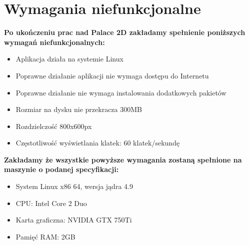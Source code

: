 \documentclass{article}
\begin{document}
\section{Wymagania niefunkcjonalne}

\textbf{Po ukończeniu prac nad Palace 2D zakładamy spełnienie poniższych
wymagań niefunkcjonalnych:}
  \begin{itemize}
  \item Aplikacja działa na systemie Linux
  \item Poprawne działanie aplikacji nie wymaga dostępu do Internetu
  \item Poprawne działanie nie wymaga instalowania dodatkowych pakietów
  \item Rozmiar na dysku nie przekracza 300MB
  \item Rozdzielczość 800x600px
  \item Częstotliwość wyświetlania klatek: 60 klatek/sekundę
  \end{itemize}


\textbf{\newline Zakładamy że wszystkie powyższe wymagania zostaną
spełnione na maszynie o podanej specyfikacji:}
\begin{itemize}
  \item System Linux x86 64, wersja jądra 4.9
  \item CPU: Intel Core 2 Duo
  \item Karta graficzna: NVIDIA GTX 750Ti
  \item Pamięć RAM: 2GB
\end{itemize}
\end{document}

